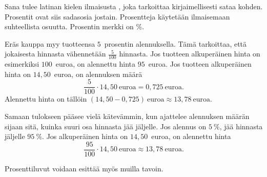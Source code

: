 Sana  tulee latinan kielen ilmaisusta ,
joka tarkoittaa kirjaimellisesti sataa kohden. 
Prosentit ovat siis sadasosia jostain.
Prosentteja käytetään ilmaisemaan suhteellista osuutta.
Prosentin merkki on \%.


\begin{esimerkki}
Eräs kauppa myy tuotteensa $5$~prosentin alennuksella. Tämä tarkoittaa, että jokaisesta hinnasta vähennetään $\frac{5}{100}$ hinnasta. Jos tuotteen alkuperäinen hinta on esimerkiksi $100$~euroa, on alennettu hinta $95$~euroa. Jos tuotteen alkuperäinen hinta on $14,50$~euroa, on alennuksen määrä
\[
	\frac{5}{100} \cdot 14,50~\text{euroa} = 0,725~\text{euroa}.
\]
Alennettu hinta on tällöin $(14,50 - 0,725)~\text{euroa} \approx 13,78~\text{euroa}$.

Samaan tulokseen pääsee vielä kätevämmin, kun ajattelee alennuksen määrän sijaan sitä, kuinka suuri osa hinnasta jää jäljelle. Jos alennus on $5~\%$, jää hinnasta jäljelle $95~\%$. Jos alkuperäinen hinta on $14,50$~euroa, on alennettu hinta 
\[
	\frac{95}{100} \cdot 14,50~\text{euroa} \approx 13,78~\text{euroa}.
\]
\end{esimerkki}

\begin{esimerkki}
    Prosenttiluvut voidaan esittää myös muilla tavoin.
    \begin{alakohdat}
    \end{alakohdat}
\end{esimerkki}


